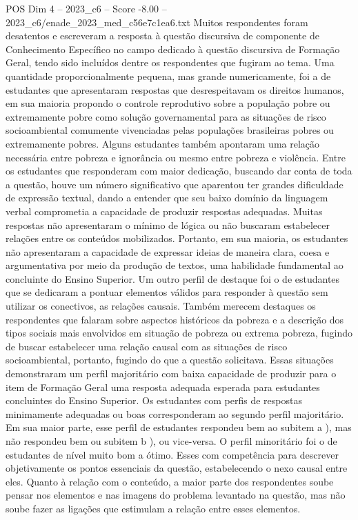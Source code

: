 \begin{textsample}{POS Dim 4 – 2023\_c6 – Score -8.00 – 2023\_c6/enade\_2023\_med\_c56e7c1ea6.txt}
Muitos respondentes foram desatentos e escreveram a resposta à questão discursiva de componente de Conhecimento Específico no campo dedicado à questão discursiva de Formação Geral, tendo sido incluídos dentre os respondentes que fugiram ao tema.
Uma quantidade proporcionalmente pequena, mas grande numericamente, foi a de estudantes que apresentaram respostas que desrespeitavam os direitos humanos, em sua maioria propondo o controle reprodutivo sobre a população pobre ou extremamente pobre como solução governamental para as situações de risco socioambiental comumente vivenciadas pelas populações brasileiras pobres ou extremamente pobres.
Alguns estudantes também apontaram uma relação necessária entre pobreza e ignorância ou mesmo entre pobreza e violência.
Entre os estudantes que responderam com maior dedicação, buscando dar conta de toda a questão, houve um número significativo que aparentou ter grandes dificuldade de expressão textual, dando a entender que seu baixo domínio da linguagem verbal comprometia a capacidade de produzir respostas adequadas.
Muitas respostas não apresentaram o mínimo de lógica ou não buscaram estabelecer relações entre os conteúdos mobilizados.
Portanto, em sua maioria, os estudantes não apresentaram a capacidade de expressar ideias de maneira clara, coesa e argumentativa por meio da produção de textos, uma habilidade fundamental ao concluinte do Ensino Superior.
Um outro perfil de destaque foi o de estudantes que se dedicaram a pontuar elementos válidos para responder à questão sem utilizar os conectivos, as relações causais.
Também merecem destaques os respondentes que falaram sobre aspectos históricos da pobreza e a descrição dos tipos sociais mais envolvidos em situação de pobreza ou extrema pobreza, fugindo de buscar estabelecer uma relação causal com as situações de risco socioambiental, portanto, fugindo do que a questão solicitava.
Essas situações demonstraram um perfil majoritário com baixa capacidade de produzir para o item de Formação Geral uma resposta adequada esperada para estudantes concluintes do Ensino Superior.
Os estudantes com perfis de respostas minimamente adequadas ou boas corresponderam ao segundo perfil majoritário.
Em sua maior parte, esse perfil de estudantes respondeu bem ao subitem a ), mas não respondeu bem ou subitem b ), ou vice-versa.
O perfil minoritário foi o de estudantes de nível muito bom a ótimo.
Esses com competência para descrever objetivamente os pontos essenciais da questão, estabelecendo o nexo causal entre eles.
Quanto à relação com o conteúdo, a maior parte dos respondentes soube pensar nos elementos e nas imagens do problema levantado na questão, mas não soube fazer as ligações que estimulam a relação entre esses elementos.

\end{textsample}
